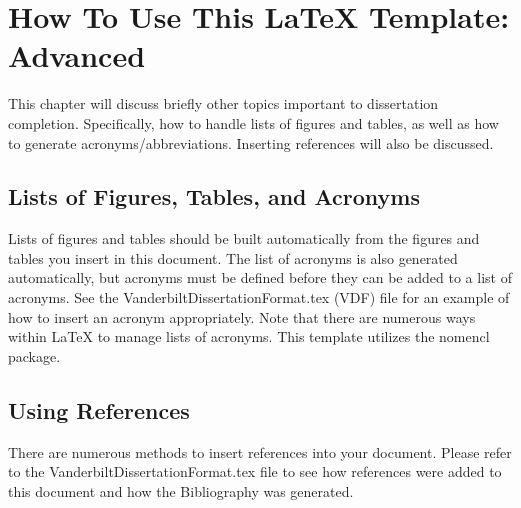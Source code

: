 \chapter{How To Use This LaTeX Template: Advanced}
This chapter will discuss briefly other topics important to dissertation completion. Specifically, how to handle lists of figures and tables, as well as how to generate acronyms/abbreviations. Inserting references will also be discussed.

\section{ Lists of Figures, Tables, and Acronyms}
Lists of figures and tables should be built automatically from the figures and tables you insert in this document. The list of acronyms is also generated automatically, but acronyms must be defined before they can be added to a list of acronyms. See the  VanderbiltDissertationFormat.tex (VDF) file for an example of how to insert an acronym appropriately. Note that there are numerous ways within LaTeX to manage lists of acronyms. This template utilizes the nomencl package.

\section{Using References}
There are numerous methods to insert references into your document. Please refer to the VanderbiltDissertationFormat.tex file to see how references were added to this document and how the Bibliography was generated.
